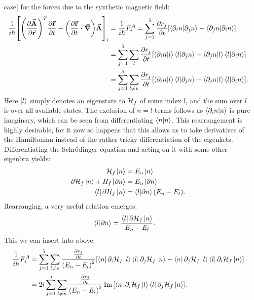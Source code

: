 \documentclass[a4paper]{article}
\begin{document}
case] for the forces due to the synthetic magnetic field:
\begin{align*}
             \frac{1}{i\hbar{}}\bqty{\pqty{\frac{\partial \va{A}}{\partial \va{r}}}^T \frac{\partial
\va{r}}{\partial t} - \pqty{\frac{\partial \va{r}}{\partial t}  \vdot \grad}\va{A}}_i
 &= \frac{1}{i\hbar{}}F_{i}^A = \sum_{j=1}^{5} \frac{\partial
        r_j}{\partial t} \bqty{\bra{\partial_i n}\ket{\partial_j n}-\bra{\partial_j n}\ket{\partial_i
        n}}\\
        &= \sum_{j=1}^{5} \sum_{l} \frac{\partial r_j}{\partial t}\bqty{\bra{\partial_i
                n}\ket{l}\bra{l}\ket{\partial_j n}- \bra{\partial_j
        n}\ket{l}\bra{l}\ket{\partial_i n}}\\
        &= \sum_{j=1}^{5} \sum_{l \ne n} \frac{\partial r_j}{\partial t}\bqty{\bra{\partial_i
                n}\ket{l}\bra{l}\ket{\partial_j n}- \bra{\partial_j
        n}\ket{l}\bra{l}\ket{\partial_i n}}
.\end{align*}
Here \(\ket{l}\) simply denotes an eigenstate to \(\mathbb{\cal H}_{f}\) of some index
\(l\), and the sum over \(l\) is over all available states. The exclusion of \(n=l\)-terms follows as
\(\bra{\partial_i n}\ket{n}\) is pure imaginary, which can be seen from differentiating
\(\bra{n}\ket{n}\). This rearrangement is highly desirable, for it now so happens that this
allows us to take derivatives of the Hamiltonian instead of the rather tricky
differentiation of the eigenkets. Differentiating the Schrödinger equation and acting on it
with some other eigenbra yields:
\begin{align*}
        \mathbb{\cal H}_f \ket{n} &= E_n \ket{n}\\
        \partial \mathbb{\cal H}_f \ket{n} + H_f \ket{\partial n} &= E_n \ket{\partial n}\\
        \bra{l}\partial \mathbb{\cal H}_f \ket{n} &= \bra{l}\ket{\partial n}(E_n - E_l)
.\end{align*}
Rearranging, a very useful relation emerges:
\begin{align}\label{eq:Hdiff}
        \bra{l}\ket{\partial n} &= \frac{\bra{l}\partial \mathbb{\cal H}_f \ket{n}}{E_n
        - E_l}
.\end{align}
This we can insert into above:
\begin{align}\label{eq:FA}
\frac{1}{i\hbar{}}F_i^A &= \sum_{j=1}^{5} \sum_{l \ne n} \frac{\frac{\partial r_j}{\partial
        t}}{\pqty{E_n-E_l}^2}\bqty{\bra{n}\partial_i \mathbb{\cal H}_f
        \ket{l}\bra{l}\partial_j\mathbb{\cal H}_f\ket{n} - \bra{n}\partial_j \mathbb{\cal
        H}_f\ket{l}\bra{l}\partial_i \mathbb{\cal H}_f\ket{n}}\\
        &= 2i\sum_{j=1}^{5} \sum_{l \ne n} \frac{\frac{\partial r_j}{\partial
        t}}{\pqty{E_n-E_l}^2} \Im \bqty{\bra{n}\partial_i \mathbb{\cal H}_f
        \ket{l}\bra{l}\partial_j\mathbb{\cal H}_f\ket{n}}
.\end{align}
\end{document}
